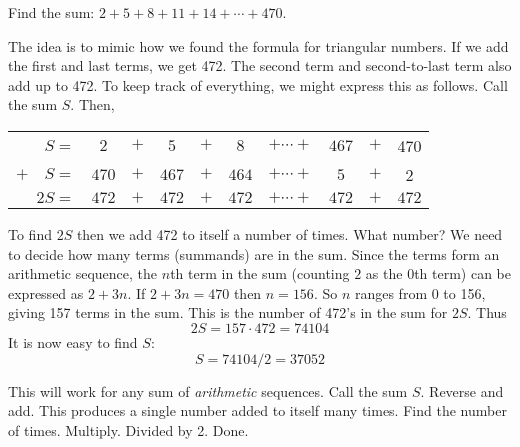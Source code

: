 \documentclass[12pt]{article}
\begin{document}
\begin{example}
  Find the sum:  $2 + 5 + 8 + 11 + 14 + \cdots + 470$.

  \begin{solution}
    The idea is to mimic how we found the formula for triangular numbers.  If we add the first and last terms, we get 472.  The second term and second-to-last term also add up to 472.  To keep track of everything, we might express this as follows.  Call the sum $S$.  Then,

    \begin{center}
    \begin{tabular}{rccccccccc}
      $S  =  $& $2 $&$ + $& $5$ & $ + $ & $8$ & $+ \cdots + $ & $467$ &$ + $ & 470 \\
     $+ \quad S  = $& $470$ & $+ $ & $467$ & $ + $ & $464$& $+ \cdots + $&$ 5$ & $+$ & 2 \\ \hline
     $2S  = $& $472$ & $+ $ & $472$ & $ + $ & $472$& $+ \cdots + $&$472$ & $+$ & $472$ \\
    \end{tabular}
    \end{center}

    To find $2S$ then we add 472 to itself a number of times.  What number?  We need to decide how many terms (summands) are in the sum.  Since the terms form an arithmetic sequence, the $n$th term in the sum (counting $2$ as the 0th term) can be expressed as $2 + 3n$.  If $2 + 3n = 470$  then $n = 156$.  So $n$ ranges from 0 to 156, giving 157 terms in the sum.  This is the number of 472's in the sum for $2S$.  Thus
    \[2S = 157\cdot 472 = 74104\]
    It is now easy to find $S$:
    \[S = 74104/2 = 37052\]
  \end{solution}
\end{example}

This will work for any sum of {\em arithmetic} sequences.  Call the sum $S$.  Reverse and add.  This produces a single number added to itself many times.  Find the number of times.  Multiply.  Divided by 2.  Done.
\end{document}
